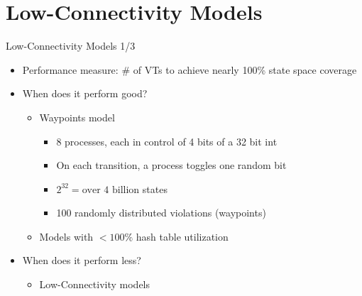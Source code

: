 \documentclass[aspectratio=169]{beamer}
\begin{document}
\section{Low-Connectivity Models}

\begin{frame}{Low-Connectivity Models 1/3}
    \begin{itemize}
        \item Performance measure: \# of VTs to achieve nearly 100\% state space coverage
        \item When does it perform good?
              \begin{itemize}
                  \item Waypoints model
                        \begin{itemize}
                            \item 8 processes, each in control of 4 bits of a 32 bit int
                            \item On each transition, a process toggles one random bit
                            \item $2^{32} = \text{over 4 billion}$ states
                            \item 100 randomly distributed violations (waypoints)
                        \end{itemize}
                  \item Models with $<100\%$ hash table utilization
              \end{itemize}
        \item When does it perform less?
              \begin{itemize}
                  \item Low-Connectivity models
              \end{itemize}
    \end{itemize}
\end{frame}
\end{document}
